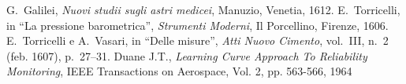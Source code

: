 \documentclass[
    corpo=11.5pt,
    oneside,
    evenboxes,
    tipotesi=triennale,
    stile=classica,
    oldstyle,
    autoretitolo,
    greek,
]{toptesi}
\begin{document}
\appendix

\begin{thebibliography}{9}
 G.~Galilei, {\em Nuovi studii sugli astri medicei}, Manuzio,
        Venetia, 1612.
 E.~Torricelli, in ``La pressione barometrica'', {\em Strumenti
        Moderni}, Il Porcellino, Firenze, 1606.
 E.~Torricelli e A.~Vasari, in ``Delle misure'', {\em Atti Nuovo
        Cimento}, vol.~III, n.~2 (feb. 1607), p.~27--31.
 Duane J.T., \emph{Learning Curve Approach To Reliability 
		Monitoring}, IEEE Transactions on Aerospace, Vol. 2, pp. 563-566, 1964
\end{thebibliography}
\end{document}
